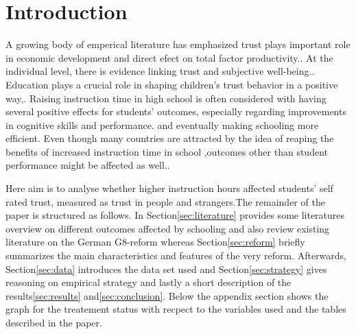 \documentclass[11pt, a4paper, leqno]{article}
\begin{document}
\section{Introduction\label{sec:introduction}}
A growing body of emperical literature has emphasized trust plays important role 
in economic development and direct efect on total factor productivity.\autocite{knack1997does}.
At the individual level, there is evidence linking trust and subjective well-being.\citep{helliwell2010trust}. 
Education plays a crucial role in shaping children's trust behavior in a positive way,\citep{glaeser2007does}.  
Raising instruction time in high school is often considered with having several positive effects for students'
outcomes,  especially regarding improvements in cognitive skills and performance.\citep{huebener2017increased}  
and eventually making schooling more efficient.  Even though many countries are attracted by the idea of 
reaping the benefits of increased instruction time in school \citep{oecd2016},outcomes other than student performance 
might be affected as well.\citep{dahmann2014impact,dahmann2018cross}.\par
Here aim is to analyse whether higher instruction hours affected students' self rated trust, 
measured as trust in people and strangers.The remainder of the paper is structured as follows. 
In Section\ref{sec:literature} provides some literatures overview on different outcomes affected 
by schooling and also review existing literature on the German G8-reform whereas 
Section\ref{sec:reform} briefly summarizes the main characteristics and features of the 
very reform. Afterwards, Section\ref{sec:data} introduces the data set used and
Section\ref{sec:strategy} gives reasoning on empirical strategy and lastly a short description 
of the results\ref{sec:results} and\ref{sec:conclusion}. Below the appendix section shows the graph for 
the treatement status with recpect to the variables used and the tables described in the paper. 
\end{document}

